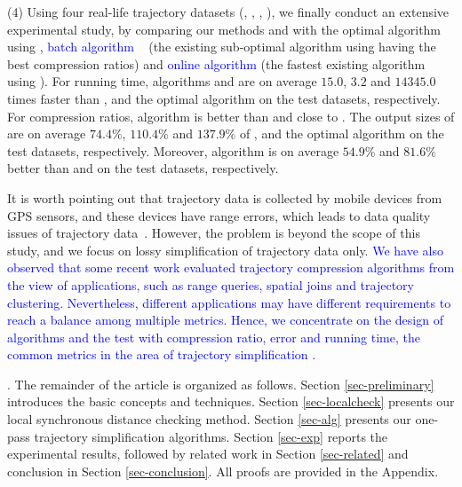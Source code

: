 \sstab (4) Using four real-life trajectory datasets (\sercar, \geolife, \mopsi, \pricar),
we finally conduct an extensive experimental study, by comparing our methods \cist and \cista  with the optimal \lsa algorithm using \sed, \textcolor{blue}{batch algorithm} \dps~\cite{Meratnia:Spatiotemporal} (the existing sub-optimal \lsa algorithm using \sed having the best compression ratios) and \textcolor{blue}{online algorithm} \squishe \cite{Muckell:Compression} (the fastest existing \lsa algorithm using \sed).
%
For running time, algorithms \cist and \cista are on average $15.0$, $3.2$ and $14345.0$ times faster than \dps, \squishe and the optimal \lsa algorithm on the test datasets, respectively.
%
For compression ratios, algorithm \cist is better than \squishe and close to \dps. The output sizes of \cist are on average $74.4\%$, $110.4\%$ and $137.9\%$ of \squishe, \dps and the optimal \lsa algorithm on the test datasets, respectively.
Moreover, algorithm \cista is on average $54.9\%$ and $81.6\%$ better than \squishe and \dps on the test datasets, respectively.

It is worth pointing out that trajectory data is collected by mobile devices from GPS sensors, and these devices have range errors, which leads to data quality issues of  trajectory data~\cite{PfoserJ99,ZufleTPRRLDE17}. However, the problem is beyond the scope of this study, and we focus on lossy simplification of trajectory data only.
%
\textcolor{blue}{We have also observed that some recent work \cite{Zhang:Evaluation} evaluated trajectory compression algorithms from the view of applications, such as range queries, spatial joins and trajectory clustering. Nevertheless, different applications may have different requirements to reach a balance among multiple metrics. Hence, we concentrate on the design of algorithms and the test with compression ratio, error and running time, the common metrics in the area of trajectory simplification \cite{Meratnia:Spatiotemporal, Muckell:Compression, Chen:Trajectory, Cao:Spatio, Liu:BQS, Liu:Amnesic, Lin:Operb, Chen:Fast}.}

.
The remainder of the article is organized as follows.
Section \ref{sec-preliminary} introduces the basic concepts and techniques.
Section \ref{sec-localcheck} presents our local synchronous distance checking method.
Section \ref{sec-alg} presents our one-pass trajectory simplification algorithms.
Section \ref{sec-exp} reports the experimental results, followed by related work in
Section \ref{sec-related} and conclusion in Section \ref{sec-conclusion}.
All proofs are provided in the Appendix.





